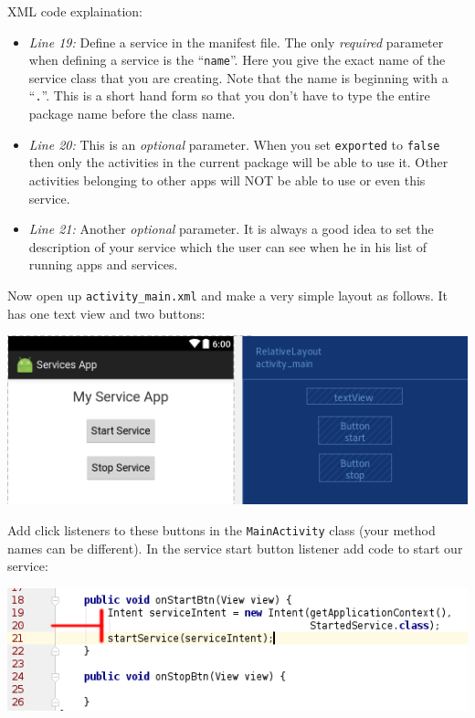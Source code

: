 XML code explaination:
\begin{itemize}
	\item \textit{Line 19:} Define a service in the manifest file. The only \textit{required} parameter when defining a service is the ``\texttt{name}''. Here you give the exact name of the service class that you are creating. Note that the name is beginning with a ``\texttt{.}''. This is a short hand form so that you don't have to type the entire package name before the class name.
	
	\item \textit{Line 20:} This is an \textit{optional} parameter. When you set \texttt{exported} to \texttt{false} then only the activities in the current package will be able to use it. Other activities belonging to other apps will NOT be able to use or even this service.
	
	\item \textit{Line 21:} Another \textit{optional} parameter. It is always a good idea to set the description of your service which the user can see when he in his list of running apps and services.
\end{itemize}

Now open up \texttt{activity\_main.xml} and make a very simple layout as follows. It has one text view and two buttons:

\begin{center}
	\includegraphics[scale=\SourceCodeScale]{chapters/ch14/images/6}
\end{center}

Add click listeners to these buttons in the \texttt{MainActivity} class (your method names can be different). In the service start button listener add code to start our service:

\begin{center}
	\includegraphics[scale=\SourceCodeScale]{chapters/ch14/images/7}
\end{center}

